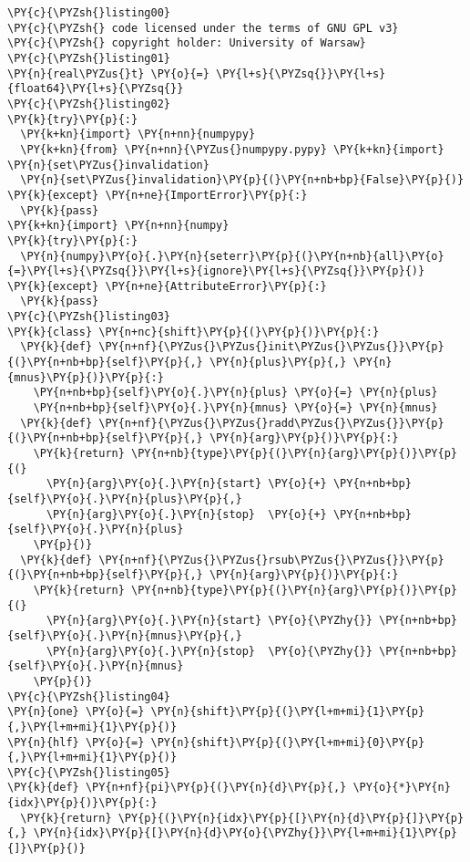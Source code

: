 \begin{Verbatim}[commandchars=\\\{\}]
\PY{c}{\PYZsh{}listing00}
\PY{c}{\PYZsh{} code licensed under the terms of GNU GPL v3}
\PY{c}{\PYZsh{} copyright holder: University of Warsaw}
\PY{c}{\PYZsh{}listing01}
\PY{n}{real\PYZus{}t} \PY{o}{=} \PY{l+s}{\PYZsq{}}\PY{l+s}{float64}\PY{l+s}{\PYZsq{}}
\PY{c}{\PYZsh{}listing02}
\PY{k}{try}\PY{p}{:}
  \PY{k+kn}{import} \PY{n+nn}{numpypy}
  \PY{k+kn}{from} \PY{n+nn}{\PYZus{}numpypy.pypy} \PY{k+kn}{import} \PY{n}{set\PYZus{}invalidation}
  \PY{n}{set\PYZus{}invalidation}\PY{p}{(}\PY{n+nb+bp}{False}\PY{p}{)}
\PY{k}{except} \PY{n+ne}{ImportError}\PY{p}{:}
  \PY{k}{pass}
\PY{k+kn}{import} \PY{n+nn}{numpy}
\PY{k}{try}\PY{p}{:} 
  \PY{n}{numpy}\PY{o}{.}\PY{n}{seterr}\PY{p}{(}\PY{n+nb}{all}\PY{o}{=}\PY{l+s}{\PYZsq{}}\PY{l+s}{ignore}\PY{l+s}{\PYZsq{}}\PY{p}{)}
\PY{k}{except} \PY{n+ne}{AttributeError}\PY{p}{:}
  \PY{k}{pass}
\PY{c}{\PYZsh{}listing03}
\PY{k}{class} \PY{n+nc}{shift}\PY{p}{(}\PY{p}{)}\PY{p}{:}
  \PY{k}{def} \PY{n+nf}{\PYZus{}\PYZus{}init\PYZus{}\PYZus{}}\PY{p}{(}\PY{n+nb+bp}{self}\PY{p}{,} \PY{n}{plus}\PY{p}{,} \PY{n}{mnus}\PY{p}{)}\PY{p}{:}
    \PY{n+nb+bp}{self}\PY{o}{.}\PY{n}{plus} \PY{o}{=} \PY{n}{plus}
    \PY{n+nb+bp}{self}\PY{o}{.}\PY{n}{mnus} \PY{o}{=} \PY{n}{mnus}
  \PY{k}{def} \PY{n+nf}{\PYZus{}\PYZus{}radd\PYZus{}\PYZus{}}\PY{p}{(}\PY{n+nb+bp}{self}\PY{p}{,} \PY{n}{arg}\PY{p}{)}\PY{p}{:} 
    \PY{k}{return} \PY{n+nb}{type}\PY{p}{(}\PY{n}{arg}\PY{p}{)}\PY{p}{(}
      \PY{n}{arg}\PY{o}{.}\PY{n}{start} \PY{o}{+} \PY{n+nb+bp}{self}\PY{o}{.}\PY{n}{plus}\PY{p}{,} 
      \PY{n}{arg}\PY{o}{.}\PY{n}{stop}  \PY{o}{+} \PY{n+nb+bp}{self}\PY{o}{.}\PY{n}{plus}
    \PY{p}{)}
  \PY{k}{def} \PY{n+nf}{\PYZus{}\PYZus{}rsub\PYZus{}\PYZus{}}\PY{p}{(}\PY{n+nb+bp}{self}\PY{p}{,} \PY{n}{arg}\PY{p}{)}\PY{p}{:} 
    \PY{k}{return} \PY{n+nb}{type}\PY{p}{(}\PY{n}{arg}\PY{p}{)}\PY{p}{(}
      \PY{n}{arg}\PY{o}{.}\PY{n}{start} \PY{o}{\PYZhy{}} \PY{n+nb+bp}{self}\PY{o}{.}\PY{n}{mnus}\PY{p}{,} 
      \PY{n}{arg}\PY{o}{.}\PY{n}{stop}  \PY{o}{\PYZhy{}} \PY{n+nb+bp}{self}\PY{o}{.}\PY{n}{mnus}
    \PY{p}{)}
\PY{c}{\PYZsh{}listing04}
\PY{n}{one} \PY{o}{=} \PY{n}{shift}\PY{p}{(}\PY{l+m+mi}{1}\PY{p}{,}\PY{l+m+mi}{1}\PY{p}{)} 
\PY{n}{hlf} \PY{o}{=} \PY{n}{shift}\PY{p}{(}\PY{l+m+mi}{0}\PY{p}{,}\PY{l+m+mi}{1}\PY{p}{)}
\PY{c}{\PYZsh{}listing05}
\PY{k}{def} \PY{n+nf}{pi}\PY{p}{(}\PY{n}{d}\PY{p}{,} \PY{o}{*}\PY{n}{idx}\PY{p}{)}\PY{p}{:} 
  \PY{k}{return} \PY{p}{(}\PY{n}{idx}\PY{p}{[}\PY{n}{d}\PY{p}{]}\PY{p}{,} \PY{n}{idx}\PY{p}{[}\PY{n}{d}\PY{o}{\PYZhy{}}\PY{l+m+mi}{1}\PY{p}{]}\PY{p}{)}

\end{Verbatim}
